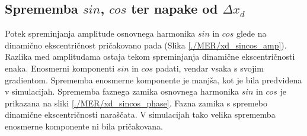 \subsection{Sprememba $sin$, $cos$ ter napake od $\Delta x_d$}

Potek spreminjanja amplitude osnovnega harmonika $sin$ in $cos$ glede na dinamično ekscentričnost pričakovano pada (Slika \ref{./MER/xd_sincos_amp}). Razlika med amplitudama ostaja tekom spreminjanja dinamične ekscentričnosti enaka. Enosmerni komponenti $sin$ in $cos$ padati, vendar vsaka s svojim gradientom. Sprememba enosmerne komponente je manjša, kot je bila predvidena v simulacijah. Sprememba faznega zamika osnovnega harmonika $sin$ in $cos$ je prikazana na sliki \ref{./MER/xd_sincos_phase}. Fazna zamika s spremebo dinamične ekscentričnosti naraščata. V simulacijah tako velika sprememba enosmerne komponente ni bila pričakovana.

